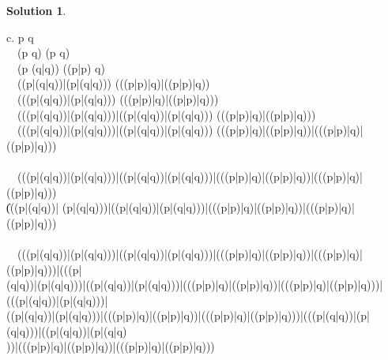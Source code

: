 \documentclass{article}
\theoremstyle{definition}
\newtheorem*{solution}{Solution}
\begin{document}
\begin{solution}
\begin{compactenum}
c. p \oplus q\ \\
\ \equiv \ (p \wedge \neg q) \vee (\neg p \wedge q)\ \\
\ \equiv \ (p \wedge (q|q)) \vee ((p|p) \wedge q)\ \\ 
\ \equiv \ ((p|(q|q))|(p|(q|q))) \vee (((p|p)|q)|((p|p)|q))\ \\ 
\ \equiv \ \neg (\neg ((p|(q|q))|(p|(q|q))) \wedge \neg(((p|p)|q)|((p|p)|q)))\ \\
\ \equiv \ \neg (((p|(q|q))|(p|(q|q)))|((p|(q|q))|(p|(q|q))) \wedge \neg(((p|p)|q)|((p|p)|q)))\ \\
\ \equiv \ \neg (((p|(q|q))|(p|(q|q)))|((p|(q|q))|(p|(q|q))) \wedge (((p|p)|q)|((p|p)|q))|(((p|p)|q)|((p|p)|q)))\ \\
\ \\
\ \equiv \ \neg (((p|(q|q))|(p|(q|q)))|((p|(q|q))|(p|(q|q)))|(((p|p)|q)|((p|p)|q))|(((p|p)|q)|((p|p)|q)))\\ \|(((p|(q|q))|
(p|(q|q)))|((p|(q|q))|(p|(q|q)))|(((p|p)|q)|((p|p)|q))|(((p|p)|q)|((p|p)|q)))\ \\
\ \\
\ \equiv \ (((p|(q|q))|(p|(q|q)))|((p|(q|q))|(p|(q|q)))|(((p|p)|q)|((p|p)|q))|(((p|p)|q)|((p|p)|q)))|(((p|\\
(q|q))|(p|(q|q)))|((p|(q|q))|(p|(q|q)))|(((p|p)|q)|((p|p)|q))|(((p|p)|q)|((p|p)|q)))|(((p|(q|q))|(p|(q|q)))|\\
((p|(q|q))|(p|(q|q)))|(((p|p)|q)|((p|p)|q))|(((p|p)|q)|((p|p)|q)))|(((p|(q|q))|(p|(q|q)))|((p|(q|q))|(p|(q|q)\\ ))|(((p|p)|q)|((p|p)|q))|(((p|p)|q)|((p|p)|q)))\ \\

\end{compactenum}


\end{solution}
\end{document}
